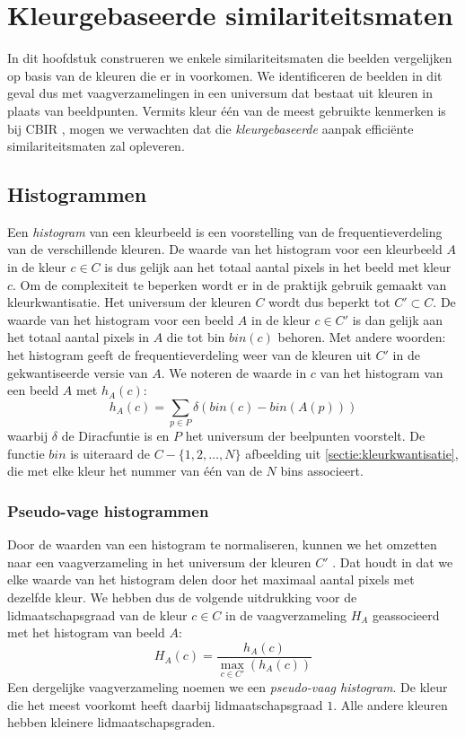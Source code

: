 \chapter{Kleurgebaseerde similariteitsmaten}

In dit hoofdstuk construeren we enkele similariteitsmaten die beelden 
vergelijken op basis van de kleuren die er in voorkomen. We identificeren de beelden
in dit geval dus met vaagverzamelingen in een universum dat bestaat uit kleuren 
in plaats van beeldpunten. Vermits kleur \'e\'en  van de meest gebruikte kenmerken is bij CBIR 
\cite{rui:image_retr, schettini:survey_of_methods_for_colour_image_indexing_and_retrieval}, mogen we 
verwachten dat die \emph{kleurgebaseerde} aanpak effici\"ente 
similariteitsmaten zal opleveren. 

\section{Histogrammen}

Een \emph{histogram} van een kleurbeeld is een voorstelling van de frequentieverdeling 
van de verschillende kleuren. De waarde van het histogram voor een kleurbeeld 
$A$ in de kleur $c \in C$ is dus gelijk aan het totaal aantal pixels in het beeld met 
kleur $c$. Om de complexiteit te beperken wordt er in de praktijk gebruik gemaakt
van kleurkwantisatie. Het universum der kleuren $C$ wordt dus beperkt tot $C' \subset C$. 
De waarde van het histogram voor een beeld $A$ in de kleur $c \in C'$ is dan gelijk aan 
het totaal aantal pixels in $A$ die tot bin $bin(c)$ behoren. Met andere woorden: het histogram 
geeft de frequentieverdeling weer van de kleuren uit $C'$ in de gekwantiseerde versie van 
$A$. We noteren de waarde in $c$ van het histogram van een beeld $A$ met $h_A(c)$: 
$$ 
h_A(c) = \sum_{p \in P} \delta (bin(c) - bin(A(p))) 
$$ 
waarbij $\delta$ de Diracfuntie is en $P$ het universum der beelpunten 
voorstelt. De functie $bin$ is uiteraard de $C - \{1,2,\ldots,N\}$ afbeelding 
uit \ref{sectie:kleurkwantisatie}, die met 
elke kleur het nummer van \'e\'en van de $N$ bins associeert. 


\subsection{Pseudo-vage histogrammen}

Door de waarden van een histogram te normaliseren, kunnen we het omzetten naar 
een vaagverzameling in het universum der kleuren $C'$ 
\cite{debaets:similariteitsmaten_voor_kleurbeelden, vanderweken:similariteitsmaten, vertan:embedding_fuzzy_logic_in_cbir}. 
Dat houdt in dat we elke 
waarde van het histogram delen door het maximaal aantal pixels met dezelfde 
kleur. We hebben dus de volgende uitdrukking voor de lidmaatschapsgraad van de 
kleur $c \in C$ in de vaagverzameling $H_A$ geassocieerd met het histogram 
van beeld $A$: 
$$
H_A(c) = \frac{\displaystyle h_A(c)}{\displaystyle \max_{c \in C'}(h_A(c))}
$$ 
Een dergelijke vaagverzameling noemen we een \emph{pseudo-vaag histogram}. 
De kleur die het meest voorkomt heeft daarbij lidmaatschapsgraad $1$. Alle 
andere kleuren hebben kleinere lidmaatschapsgraden. 

